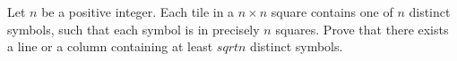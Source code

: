 Let $n$ be a positive integer. Each tile in a $n\times n$ square contains
one of $n$ distinct symbols, such that each symbol is in precisely $n$ squares.
Prove that there exists a line or a column containing at least $sqrt{n}$ distinct symbols.

